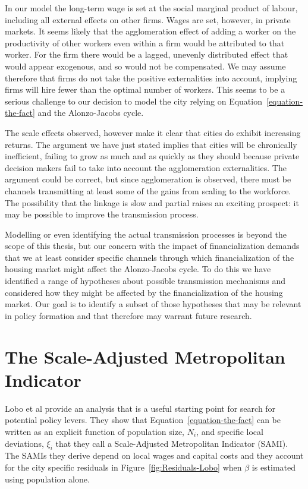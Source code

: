  In our model the long-term wage is set at the social marginal product of labour, including all external effects on other firms. Wages are set, however, in private markets. It seems likely that the agglomeration effect of adding a worker on the productivity of other workers even within a firm  would be attributed to that worker. For the firm there  would be a lagged, unevenly distributed effect that would appear exogenous, and so would not be
compensated. We may assume therefore that firms do not take the positive externalities into account, implying firms will hire fewer than the optimal number of workers. This seems to be a serious challenge to our decision to model the city relying on Equation~\ref{equation-the-fact} and the  Alonzo-Jacobs cycle.

The scale effects observed, however make it clear that cities do exhibit increasing returns. The argument we have just stated implies  that cities will be chronically inefficient, failing to grow as  much and as quickly as they should because private decision makers fail to take into account the agglomeration externalities. The argument could be correct, but since agglomeration is observed, there must be channels  transmitting at least some of the gains from scaling to the workforce. The possibility that the linkage is slow and partial raises an exciting prospect: it may be possible to improve the  transmission process.

Modelling or even identifying  the actual transmission processes is beyond the scope of this thesis, but our concern with the impact of financialization demands that we at least consider specific channels through which financialization of the housing market might affect the Alonzo-Jacobs cycle. To do this we have identified a range of hypotheses about possible transmission mechanisms and considered how they might be affected by the financialization of the housing market. Our goal is to identify a subset of those hypotheses that may be relevant in policy formation and that therefore may warrant future research.



\section{The Scale-Adjusted Metropolitan Indicator}
 Lobo et al \cite{loboUrbanScalingProduction2013} provide an  analysis that is a useful starting point for search for potential policy levers. They show that Equation~\ref{equation-the-fact} can be written as an explicit function of population size, $N_i$, and specific local deviations, $\xi_i$ that they  call a Scale-Adjusted Metropolitan Indicator (SAMI). The SAMIs they derive depend on local wages and capital costs and they account for the city specific residuals in Figure~\ref{fig:Residuals-Lobo} when $\beta$ is estimated using population alone. 
 
